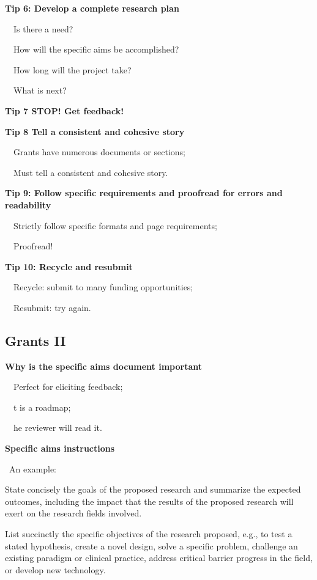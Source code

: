 \documentclass[a4paper, 12pt]{article}
\begin{document}
\newpage\textbf{Tip 6: Develop a complete research plan}
\par\ \textbullet\ Is there a need?
\par\ \textbullet\ How will the specific aims be accomplished?
\par\ \textbullet\ How long will the project take?
\par\ \textbullet\ What is next?

\textbf{Tip 7 STOP! Get feedback!}

\textbf{Tip 8 Tell a consistent and cohesive story}
\par\ \textbullet\ Grants have numerous documents or sections;
\par\ \textbullet\ Must tell a consistent and cohesive story.

\textbf{Tip 9: Follow specific requirements and proofread for errors and readability}
\par\ \textbullet\ Strictly follow specific formats and page requirements;
\par\ \textbullet\ Proofread!

\textbf{Tip 10: Recycle and resubmit}
\par\ \textbullet\ Recycle: submit to many funding opportunities;
\par\ \textbullet\ Resubmit: try again.

\subsection{Grants II}

\textbf{Why is the specific aims document important}
\par\ \textbullet\ Perfect for eliciting feedback;
\par\ \textbullet\ t is a roadmap;
\par\ \textbullet\ he reviewer will read it.

\textbf{Specific aims instructions}

\newpage\par\textbullet\ An example:
\par State concisely the goals of the proposed research and summarize the expected outcomes, including the impact that the results of the proposed research will exert on the research fields involved.
\par List succinctly the specific objectives of the research proposed, e.g., to test a stated hypothesis, create a novel design, solve a specific problem, challenge an existing paradigm or clinical practice, address critical barrier progress in the field, or develop new technology.
\end{document}
